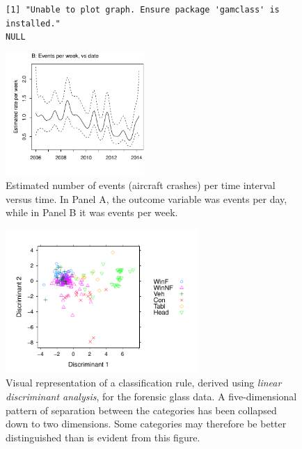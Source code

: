\documentclass[12pt, a4paper,  BCOR=8.25mm, DIV=15]{scrartcl}\usepackage[]{graphicx}\usepackage[]{color}
\makeatletter
\newenvironment{kframe}{%
 \def\at@end@of@kframe{}%
 \ifinner\ifhmode%
  \def\at@end@of@kframe{\end{minipage}}%
  \begin{minipage}{\columnwidth}%
 \fi\fi%
 \def\FrameCommand##1{\hskip\@totalleftmargin \hskip-\fboxsep
 \colorbox{shadecolor}{##1}\hskip-\fboxsep
     \hskip-\linewidth \hskip-\@totalleftmargin \hskip\columnwidth}%
 \MakeFramed {\advance\hsize-\width
   \@totalleftmargin\z@ \linewidth\hsize
   \@setminipage}}%
 {\par\unskip\endMakeFramed%
 \at@end@of@kframe}
\newenvironment{knitrout}{}{} %
\makeatother
\begin{document}
\begin{figure}[h]
\begin{knitrout}
\color{fgcolor}\begin{kframe}
\begin{verbatim}
[1] "Unable to plot graph. Ensure package 'gamclass' is installed."
NULL
\end{verbatim}
\end{kframe}

{\centering \includegraphics[width=0.47\textwidth]{figs/xmeth-au-both-12_11-1} 

}



\end{knitrout}
\caption{Estimated number of events (aircraft crashes) per time
  interval versus time.  In Panel A, the outcome variable was events
  per day, while in Panel B it was events per
  week.\label{fig:planeCrash}}
\end{figure}

\begin{figure}
\begin{knitrout}
\color{fgcolor}

{\centering \includegraphics[width=0.65\textwidth]{figs/xmeth-fgl-scores2D-12_12-1} 

}



\end{knitrout}
\caption{Visual representation of a classification rule, derived using
  {\em linear discriminant analysis}, for the forensic glass data.  A
  five-dimensional pattern of separation between the categories has
  been collapsed down to two dimensions.  Some categories may therefore
be better distinguished than is evident from this figure.
}
\label{fig:fgl}
\end{figure}
\end{document}
